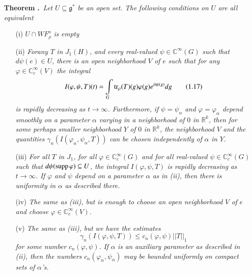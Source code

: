 \medskip
\noindent
{\bf Theorem .\label{art3-thm1.4}}~{\em Let $U\subseteq \mathfrak{g}^{*}$ be an open set. The following conditions on $U$ are all equivalent}
\begin{itemize}
\item[(i)] {\em $U\cap WF^{o}_{\rho}$ is empty}

\item[(ii)] {\em For\pageoriginale any $T$ in $J_{1}(H)$, and every real-valued $\psi\in \mathbb{C}^{\infty}(G)$ such that $d\psi(e)\in U$, there is an open neighborhood $V$ of $e$ such that for any $\varphi\in \mathbb{C}^{\infty}_{c}(V)$ the integral}
\begin{equation*}
I(\varphi,\psi,T)(t)=\int\limits_{G}\operatorname{tr}_{\rho}(T)(g)\varphi(g)e^{it\psi(g)}dg\tag{1.17}\label{art3-eq1.17}
\end{equation*}
{\em is rapidly decreasing as $t\to \infty$. Furthermore, if $\psi=\psi_{\alpha}$ and $\varphi=\varphi_{\alpha}$ depend smoothly on a parameter $\alpha$ varying in a neighborhood of $0$ in $\mathbb{R}^{k}$, then for some perhaps smaller neighborhood $Y$ of $0$ in $\mathbb{R}^{k}$, the neighborhood $V$ and the quantities $\gamma_{n}(I(\varphi_{\alpha},\psi_{\alpha},T))$ can be chosen independently of $\alpha$ in $Y$.}

\item[(iii)] {\em For all $T$ in $J_{1}$, for all $\varphi \in \mathbb{C}^{\infty}_{c}(G)$ and for all real-valued $\psi\in \mathbb{C}^{\infty}_{c}(G)$ such that $d\psi(\operatorname{supp} \varphi)\subseteq U$, the integral $I(\varphi,\psi,T)$ is rapidly decreasing as $t\to \infty$. If $\varphi$ and $\psi$ depend on a parameter $\alpha$ as in {\rm(ii)}, then there is uniformity in $\alpha$ as described there.}

\item[(iv)] {\em The same as {\em(iii)}, but is enough to choose an open neighborhood $V$ of $e$ and choose $\varphi\in \mathbb{C}^{\infty}_{c}(V)$.}

\item[(v)] {\em The same as {\em(iii)}, but we have the estimates}
\begin{equation*}
\gamma_{n}(I(\varphi,\psi,T))\leq c_{n}(\varphi,\psi)||T||_{1}\tag{1.18}\label{art3-eq1.18}
\end{equation*}
{\em for some number $c_{n}(\varphi,\psi)$. If $\alpha$ is an auxiliary parameter as described in {\em(ii)}, then the numbers $c_{n}(\varphi_{\alpha},\psi_{\alpha})$ may be bounded uniformly on compact sets of $\alpha$'s.}


\end{itemize}
